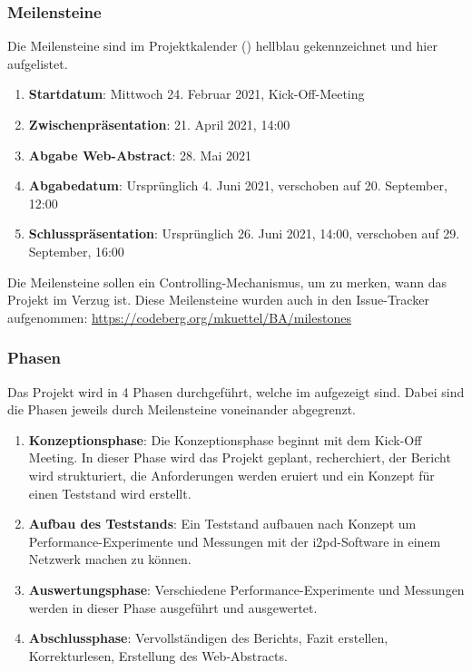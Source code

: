 
\subsubsection{Meilensteine}
\label{sec:meilensteine}

Die Meilensteine sind im Projektkalender () hellblau gekennzeichnet und hier aufgelistet.

\begin{enumerate}
    \item \textbf{Startdatum}: Mittwoch 24. Februar 2021, Kick-Off-Meeting
    \item \textbf{Zwischenpräsentation}: 21. April 2021, 14:00
    \item \textbf{Abgabe Web-Abstract}: 28. Mai 2021
    \item \textbf{Abgabedatum}: Ursprünglich 4. Juni 2021, verschoben auf 20. September, 12:00
    \item \textbf{Schlusspräsentation}: Ursprünglich 26. Juni 2021, 14:00, verschoben auf 29. September, 16:00
\end{enumerate}

Die Meilensteine sollen ein Controlling-Mechanismus, um zu merken, wann das Projekt im Verzug ist.
Diese Meilensteine wurden auch in den Issue-Tracker aufgenommen:
\url{https://codeberg.org/mkuettel/BA/milestones}

\subsubsection{Phasen}
\label{sec:phasen}

Das Projekt wird in 4 Phasen durchgeführt, welche im  aufgezeigt sind.
Dabei sind die Phasen jeweils durch Meilensteine voneinander abgegrenzt.

\begin{enumerate}
    \item \textbf{Konzeptionsphase}: Die Konzeptionsphase beginnt mit dem Kick-Off Meeting.
        In dieser Phase wird das Projekt geplant, recherchiert, der Bericht wird strukturiert, die Anforderungen werden eruiert und  ein Konzept für einen Teststand wird erstellt.
    \item \textbf{Aufbau des Teststands}: Ein Teststand aufbauen nach Konzept um Performance-Experimente und Messungen mit der i2pd-Software in einem Netzwerk machen zu können.
    \item \textbf{Auswertungsphase}: Verschiedene Performance-Experimente und Messungen werden in dieser Phase ausgeführt und ausgewertet.
    \item \textbf{Abschlussphase}: Vervollständigen des Berichts, Fazit erstellen, Korrekturlesen, Erstellung des Web-Abstracts.
\end{enumerate}

